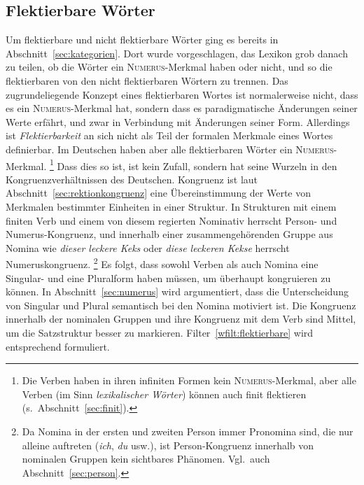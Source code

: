 \Np


\subsection{Flektierbare Wörter}

\label{sec:flektierbarewoerterwortklassen}


Um flektierbare und nicht flektierbare Wörter ging es bereits in Abschnitt~\ref{sec:kategorien}.
Dort wurde vorgeschlagen, das Lexikon grob danach zu teilen, ob die Wörter ein \textsc{Numerus}-Merkmal haben oder nicht, und so die flektierbaren von den nicht flektierbaren Wörtern zu trennen.
Das zugrundeliegende Konzept eines flektierbaren Wortes ist normalerweise nicht, dass es ein \textsc{Numerus}-Merkmal hat, sondern dass es paradigmatische Änderungen seiner Werte erfährt, und zwar in Verbindung mit Änderungen seiner Form.
Allerdings ist \textit{Flektierbarkeit} an sich nicht als Teil der formalen Merkmale eines Wortes definierbar.
Im Deutschen haben aber alle flektierbaren Wörter ein \textsc{Numerus}-Merkmal.%
\footnote{Die Verben haben in ihren infiniten Formen kein \textsc{Numerus}-Merkmal, aber alle Verben (im Sinn \textit{lexikalischer Wörter}) können auch finit flektieren (s.\ Abschnitt~\ref{sec:finit}).}
Dass dies so ist, ist kein Zufall, sondern hat seine Wurzeln in den Kongruenzverhältnissen des Deutschen.
Kongruenz ist laut Abschnitt~\ref{sec:rektionkongruenz} eine Übereinstimmung der Werte von Merkmalen bestimmter Einheiten in einer Struktur.
In Strukturen mit einem finiten Verb und einem von diesem regierten Nominativ herrscht Person- und Numerus-Kongruenz, und innerhalb einer zusammengehörenden Gruppe aus Nomina wie \textit{dieser leckere Keks} oder \textit{diese leckeren Kekse} herrscht Numeruskongruenz.%
\footnote{Da Nomina in der ersten und zweiten Person immer Pronomina sind, die nur alleine auftreten (\textit{ich}, \textit{du} usw.), ist Person-Kongruenz innerhalb von nominalen Gruppen kein sichtbares Phänomen.
Vgl.\ auch Abschnitt~\ref{sec:person}.}
Es folgt, dass sowohl Verben als auch Nomina eine Singular- und eine Pluralform haben müssen, um überhaupt kongruieren zu können.
In Abschnitt~\ref{sec:numerus} wird argumentiert, dass die Unterscheidung von Singular und Plural semantisch bei den Nomina motiviert ist.
Die Kongruenz innerhalb der nominalen Gruppen und ihre Kongruenz mit dem Verb sind Mittel, um die Satzstruktur besser zu markieren.
Filter~\ref{wfilt:flektierbare} wird entsprechend formuliert.


